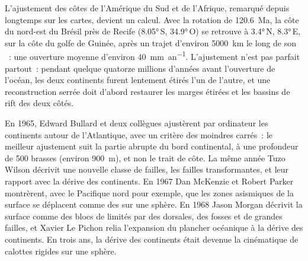 \begin{omfigure}
\par{}
\label{fig:b1:plate-kinematics:south-atlantic}
\end{omfigure}

L'ajustement des côtes de l'Amérique du Sud et de l'Afrique, remarqué depuis longtemps sur les cartes,
devient un calcul. Avec la rotation de
\qty{120.6}{Ma}, la côte du nord-est du Brésil près de Recife (\ang{8.05}\,S,
\ang{34.9}\,O) se retrouve à \ang{3.4}\,N, \ang{8.3}\,E, sur la côte du golfe de
Guinée, après un trajet d'environ \qty{5000}{km} le long de son ~: une
ouverture moyenne d'environ \qty{40}{mm.an^{-1}}. L'ajustement n'est pas parfait
partout~: pendant quelque quatorze millions d'années avant l'ouverture de l'océan, les deux
continents furent lentement étirés l'un de l'autre, et une reconstruction serrée doit d'abord
restaurer les marges étirées et les bassins de rift des deux côtés.

\begin{history}
En 1965, Edward Bullard et deux collègues ajustèrent par ordinateur les continents autour de
l'Atlantique, avec un critère des moindres carrés~: le meilleur ajustement suit la
partie abrupte du bord continental, à une profondeur de 500 brasses (environ
\qty{900}{m}), et non le trait de côte. La même année Tuzo Wilson décrivit une nouvelle
classe de failles, les failles transformantes, et leur rapport avec la dérive des continents.
En 1967 Dan McKenzie et Robert Parker montrèrent, avec le Pacifique nord pour
exemple, que les zones asismiques de la surface se déplacent comme des  sur une
sphère. En 1968 Jason Morgan décrivit la surface comme des blocs de  limités par des
dorsales, des fosses et de grandes failles, et Xavier Le Pichon relia l'expansion du plancher océanique
à la dérive des continents. En trois ans, la dérive des continents était devenue la
cinématique de calottes rigides sur une sphère.
\end{history}

